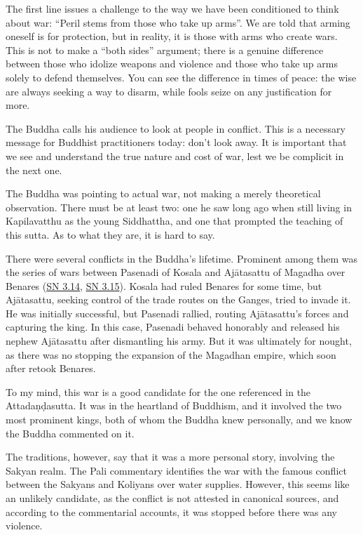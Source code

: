 \documentclass[12pt,openany]{book}%
\begin{document}
The first line issues a challenge to the way we have been conditioned to think about war: “Peril stems from those who take up arms”. We are told that arming oneself is for protection, but in reality, it is those with arms who create wars. This is not to make a “both sides” argument; there is a genuine difference between those who idolize weapons and violence and those who take up arms solely to defend themselves. You can see the difference in times of peace: the wise are always seeking a way to disarm, while fools seize on any justification for more.

The Buddha calls his audience to look at people in conflict. This is a necessary message for Buddhist practitioners today: don’t look away. It is important that we see and understand the true nature and cost of war, lest we be complicit in the next one.

The Buddha was pointing to actual war, not making a merely theoretical observation. There must be at least two: one he saw long ago when still living in Kapilavatthu as the young Siddhattha, and one that prompted the teaching of this sutta. As to what they are, it is hard to say.

There were several conflicts in the Buddha’s lifetime. Prominent among them was the series of wars between Pasenadi of Kosala and \textsanskrit{Ajātasattu} of Magadha over Benares (\href{https://suttacentral.net/sn3.14/en/sujato}{SN 3.14}, \href{https://suttacentral.net/sn3.15/en/sujato}{SN 3.15}). Kosala had ruled Benares for some time, but \textsanskrit{Ajātasattu}, seeking control of the trade routes on the Ganges, tried to invade it. He was initially successful, but Pasenadi rallied, routing \textsanskrit{Ajātasattu}’s forces and capturing the king. In this case, Pasenadi behaved honorably and released his nephew \textsanskrit{Ajātasattu} after dismantling his army. But it was ultimately for nought, as there was no stopping the expansion of the Magadhan empire, which soon after retook Benares.

To my mind, this war is a good candidate for the one referenced in the \textsanskrit{Attadaṇḍasutta}. It was in the heartland of Buddhism, and it involved the two most prominent kings, both of whom the Buddha knew personally, and we know the Buddha commented on it.

The traditions, however, say that it was a more personal story, involving the Sakyan realm. The Pali commentary identifies the war with the famous conflict between the Sakyans and Koliyans over water supplies. However, this seems like an unlikely candidate, as the conflict is not attested in canonical sources, and according to the commentarial accounts, it was stopped before there was any violence.
\end{document}

